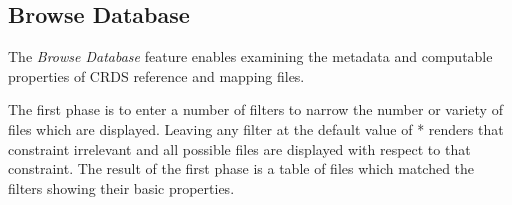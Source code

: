 \documentclass[letterpaper,10pt,english]{sphinxmanual}
\begin{document}
\subsection{Browse Database}
\label{web_site_use:browse-database}
The \emph{Browse Database} feature enables examining the metadata and computable
properties of CRDS reference and mapping files.
\begin{figure}[htbp]
\centering

\end{figure}

The first phase is to enter a number of filters to narrow the number or variety
of files which are displayed.   Leaving any filter at the default value of *
renders that constraint irrelevant and all possible files are displayed with
respect to that constraint.   The result of the first phase is a table of files
which matched the filters showing their basic properties.
\begin{figure}[htbp]
\centering

\end{figure}
\end{document}

